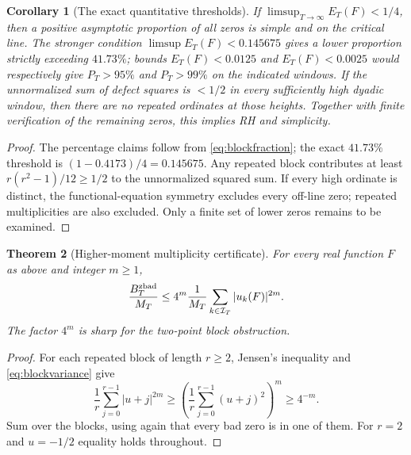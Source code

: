\documentclass[11pt,reqno]{amsart}
\numberwithin{equation}{section}
\newtheorem{theorem}{Theorem}[section]
\newtheorem{corollary}[theorem]{Corollary}
\begin{document}
\begin{corollary}[The exact quantitative thresholds]
\label{cor:thresholds}
If $\limsup_{T\to\infty}E_T(F)<1/4$, then a positive asymptotic
proportion of all zeros is simple and on the critical line.  The stronger
condition $\limsup E_T(F)<0.145675$ gives a lower proportion strictly
exceeding $41.73\%$; bounds $E_T(F)<0.0125$ and $E_T(F)<0.0025$
would respectively give $P_T>95\%$ and $P_T>99\%$ on the indicated
windows.  If the \emph{unnormalized} sum of defect squares is $<1/2$
in every sufficiently high dyadic window, then there are no repeated
ordinates at those heights.  Together with finite verification of the
remaining zeros, this implies RH and simplicity.
\end{corollary}
\begin{proof}
The percentage claims follow from \eqref{eq:blockfraction}; the exact
$41.73\%$ threshold is $(1-0.4173)/4=0.145675$.  Any repeated block
contributes at least $r(r^2-1)/12\ge1/2$ to the unnormalized squared
sum.  If every high ordinate is distinct, the functional-equation
symmetry excludes every off-line zero; repeated multiplicities are also
excluded.  Only a finite set of lower zeros remains to be examined.
\end{proof}

\begin{theorem}[Higher-moment multiplicity certificate]
\label{thm:blockmoments}
For every real function $F$ as above and integer $m\ge1$,
\begin{equation}\label{eq:blockmoments}
\frac{B_T^{\rm zbad}}{M_T}\le
4^m\frac1{M_T}\sum_{k\in\mathcal I_T}|u_k(F)|^{2m}.
\end{equation}
The factor $4^m$ is sharp for the two-point block obstruction.
\end{theorem}
\begin{proof}
For each repeated block of length $r\ge2$, Jensen's inequality and
\eqref{eq:blockvariance} give
\[
\frac1r\sum_{j=0}^{r-1}|u+j|^{2m}
\ge\left(\frac1r\sum_{j=0}^{r-1}(u+j)^2\right)^m
\ge4^{-m}.
\]
Sum over the blocks, using again that every bad zero is in one of them.
For $r=2$ and $u=-1/2$ equality holds throughout.
\end{proof}
\end{document}
